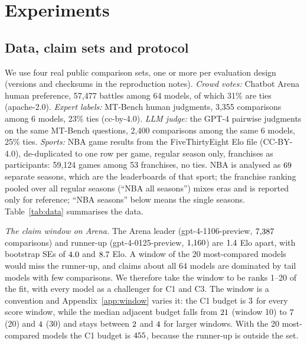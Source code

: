 \documentclass{article}
\begin{document}
\section{Experiments}
\label{sec:exp}
\subsection{Data, claim sets and protocol}
\label{sec:data}
We use four real public comparison sets, one or more per evaluation design (versions and checksums in the reproduction notes). \emph{Crowd votes:} Chatbot Arena human preference, 57{,}477 battles among 64 models, of which 31\% are ties (apache-2.0). \emph{Expert labels:} MT-Bench human judgments, 3{,}355 comparisons among 6 models, 23\% ties (cc-by-4.0). \emph{LLM judge:} the GPT-4 pairwise judgments on the same MT-Bench questions, 2{,}400 comparisons among the same 6 models, 25\% ties. \emph{Sports:} NBA game results from the FiveThirtyEight Elo file (CC-BY-4.0), de-duplicated to one row per game, regular season only, franchises as participants: 59{,}124 games among 53 franchises, no ties. NBA is analysed as $69$ separate seasons, which are the leaderboards of that sport; the franchise ranking pooled over all regular seasons (``NBA all seasons'') mixes eras and is reported only for reference; ``NBA seasons'' below means the single seasons. Table~\ref{tab:data} summarises the data.
\begin{table}[t]
\caption{The four datasets. $K$: participants (in brackets: those in the claim window, ranks 1--20 of the fit, for Arena and NBA all seasons); $N$: comparisons; Ties: share of ties; Pairs seen: participant pairs compared at least once; last column: comparisons per compared pair (min / median / max). Source: \texttt{results/dataset\_summary.csv}.}
\label{tab:data}
\centering\small

\end{table}

\emph{The claim window on Arena.} The Arena leader (gpt-4-1106-preview, $7{,}387$ comparisons) and runner-up (gpt-4-0125-preview, $1{,}160$) are $1.4$ Elo apart, with bootstrap SEs of $4.0$ and $8.7$ Elo. A window of the 20 most-compared models would miss the runner-up, and claims about all 64 models are dominated by tail models with few comparisons. We therefore take the window to be ranks 1--20 of the fit, with every model as a challenger for C1 and C3. The window is a convention and Appendix~\ref{app:window} varies it: the C1 budget is $3$ for every score window, while the median adjacent budget falls from $21$ (window 10) to $7$ (20) and $4$ (30) and stays between $2$ and $4$ for larger windows. With the 20 most-compared models the C1 budget is $455$, because the runner-up is outside the set.
\end{document}
